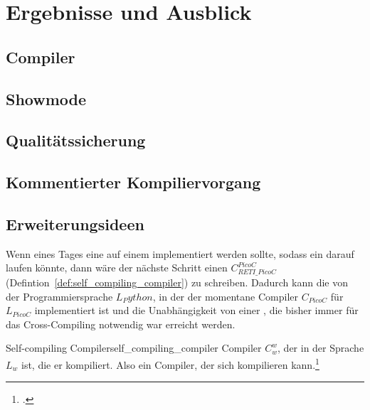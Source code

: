 
\chapter{Ergebnisse und Ausblick}
\label{ch:ergebnisse_und_ausblick}

\section{Compiler}
\section{Showmode}
\section{Qualitätssicherung}
\label{sec:qualitätssicherung}
\section{Kommentierter Kompiliervorgang}
\section{Erweiterungsideen}
Wenn eines Tages eine  auf einem  implementiert werden sollte, sodass ein  darauf laufen könnte, dann wäre der nächste Schritt einen  $C_{RETI\_PicoC}^{PicoC}$ (Defintion~\ref{def:self_compiling_compiler}) zu schreiben. Dadurch kann die  von der Programmiersprache $L_Python$, in der der momentane Compiler $C_{PicoC}$ für $L_{PicoC}$ implementiert ist und die Unabhängigkeit von einer , die bisher immer für das Cross-Compiling notwendig war erreicht werden.

\begin{Definition}{Self-compiling Compiler}{self_compiling_compiler}
  Compiler $C_w^w$, der in der Sprache $L_w$  ist, die er  kompiliert. Also ein Compiler, der sich  kompilieren kann.\footcite{earley_formalism_1970}
\end{Definition}


